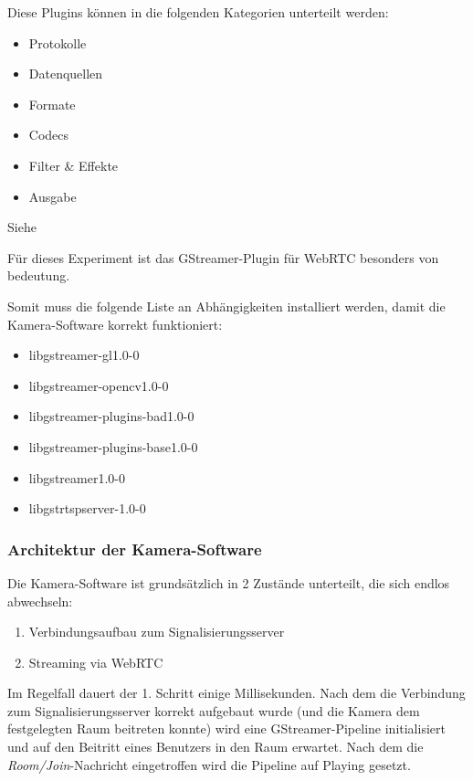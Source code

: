 \documentclass{article}
\begin{document}
\begin{onecolumn}
Diese Plugins können in die folgenden Kategorien unterteilt werden:

\begin{itemize}
	\item Protokolle
	\item Datenquellen
	\item Formate
	\item Codecs
	\item Filter \& Effekte
	\item Ausgabe
\end{itemize}

Siehe~\cite{GStreamerManualIntro}


Für dieses Experiment ist das GStreamer-Plugin für WebRTC besonders von
bedeutung.

Somit muss die folgende Liste an Abhängigkeiten installiert werden, damit die
Kamera-Software korrekt funktioniert:

\begin{itemize}\label{items:deps}
	\item libgstreamer-gl1.0-0
	\item libgstreamer-opencv1.0-0
	\item libgstreamer-plugins-bad1.0-0
	\item libgstreamer-plugins-base1.0-0
	\item libgstreamer1.0-0
	\item libgstrtspserver-1.0-0
\end{itemize}

\subsubsection{Architektur der Kamera-Software}

Die Kamera-Software ist grundsätzlich in 2 Zustände unterteilt, die sich endlos
abwechseln:

\begin{enumerate}
	\item Verbindungsaufbau zum Signalisierungsserver
	\item Streaming via WebRTC
\end{enumerate}

Im Regelfall dauert der 1. Schritt einige Millisekunden. Nach dem die
Verbindung zum Signalisierungsserver korrekt aufgebaut wurde (und die Kamera
dem festgelegten Raum beitreten konnte) wird eine GStreamer-Pipeline
initialisiert und auf den Beitritt eines Benutzers in den Raum erwartet. Nach
dem die \textit{Room/Join}-Nachricht eingetroffen wird die Pipeline auf Playing
gesetzt.


\end{onecolumn}
\end{document}
